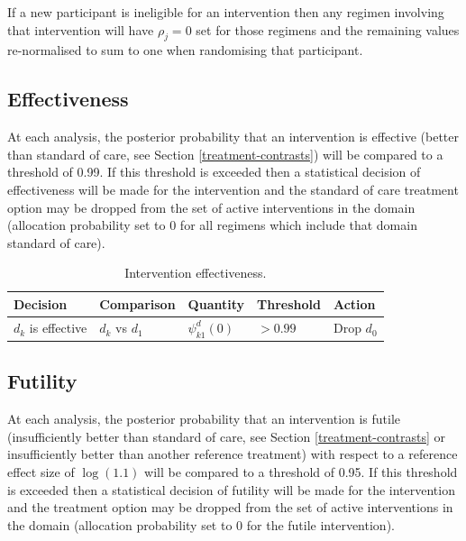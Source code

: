 \documentclass[
  11pt,
]{article}
\begin{document}
If a new participant is ineligible for an intervention then any regimen involving that intervention will have \(\rho_j=0\) set for those regimens and the remaining values re-normalised to sum to one when randomising that participant.

\hypertarget{effectiveness}{%
\subsection{Effectiveness}\label{effectiveness}}

At each analysis, the posterior probability that an intervention is effective (better than standard of care, see Section \ref{treatment-contrasts}) will be compared to a threshold of 0.99.
If this threshold is exceeded then a statistical decision of effectiveness will be made for the intervention and the standard of care treatment option may be dropped from the set of active interventions in the domain (allocation probability set to 0 for all regimens which include that domain standard of care).

\begin{table}[H]

\caption{\label{tab:unnamed-chunk-2}Intervention effectiveness.}
\centering
\begin{tabular}[t]{lllll}
\toprule
Decision & Comparison & Quantity & Threshold & Action\\
\midrule
$d_k$ is effective & $d_k$ vs $d_1$ & $\psi_{k1}^d(0)$ & $>0.99$ & Drop $d_0$\\
\bottomrule
\end{tabular}
\end{table}

\hypertarget{futility}{%
\subsection{Futility}\label{futility}}

At each analysis, the posterior probability that an intervention is futile (insufficiently better than standard of care, see Section \ref{treatment-contrasts} or insufficiently better than another reference treatment) with respect to a reference effect size of \(\log(1.1)\) will be compared to a threshold of 0.95.
If this threshold is exceeded then a statistical decision of futility will be made for the intervention and the treatment option may be dropped from the set of active interventions in the domain (allocation probability set to 0 for the futile intervention).
\end{document}
